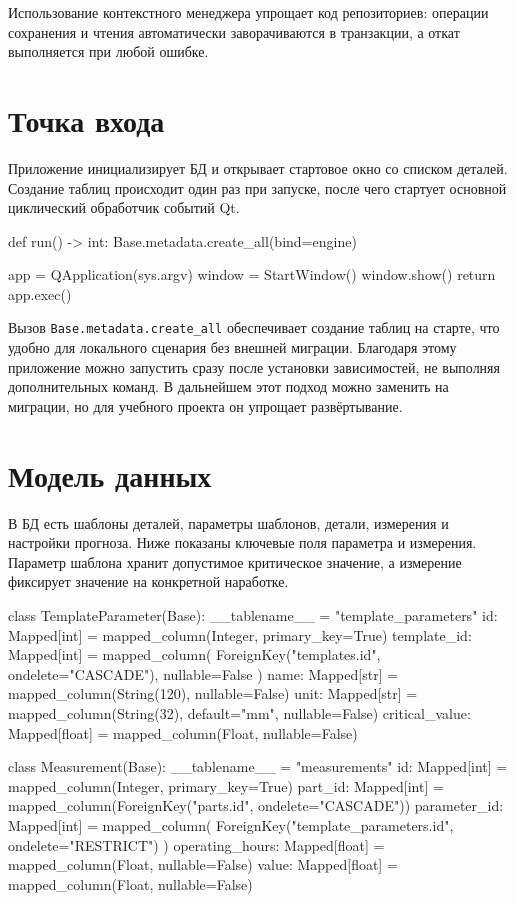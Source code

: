 \documentclass[12pt,a4paper]{article}
\begin{document}
Использование контекстного менеджера упрощает код репозиториев:
операции сохранения и чтения автоматически заворачиваются в транзакции,
а откат выполняется при любой ошибке.

\section*{Точка входа}
Приложение инициализирует БД и открывает стартовое окно со списком деталей.
Создание таблиц происходит один раз при запуске, после чего стартует основной
циклический обработчик событий Qt.
\begin{codeblock}
def run() -> int:
    Base.metadata.create_all(bind=engine)

    app = QApplication(sys.argv)
    window = StartWindow()
    window.show()
    return app.exec()
\end{codeblock}

Вызов \texttt{Base.metadata.create\_all} обеспечивает создание таблиц на старте,
что удобно для локального сценария без внешней миграции. Благодаря этому
приложение можно запустить сразу после установки зависимостей, не выполняя
дополнительных команд. В дальнейшем этот подход можно заменить на миграции,
но для учебного проекта он упрощает развёртывание.

\section*{Модель данных}
В БД есть шаблоны деталей, параметры шаблонов, детали, измерения и настройки прогноза.
Ниже показаны ключевые поля параметра и измерения.
Параметр шаблона хранит допустимое критическое значение, а измерение фиксирует
значение на конкретной наработке.
\begin{codeblock}
class TemplateParameter(Base):
    __tablename__ = "template_parameters"
    id: Mapped[int] = mapped_column(Integer, primary_key=True)
    template_id: Mapped[int] = mapped_column(
        ForeignKey("templates.id", ondelete="CASCADE"), nullable=False
    )
    name: Mapped[str] = mapped_column(String(120), nullable=False)
    unit: Mapped[str] = mapped_column(String(32), default="mm", nullable=False)
    critical_value: Mapped[float] = mapped_column(Float, nullable=False)
\end{codeblock}

\begin{codeblock}
class Measurement(Base):
    __tablename__ = "measurements"
    id: Mapped[int] = mapped_column(Integer, primary_key=True)
    part_id: Mapped[int] = mapped_column(ForeignKey("parts.id", ondelete="CASCADE"))
    parameter_id: Mapped[int] = mapped_column(
        ForeignKey("template_parameters.id", ondelete="RESTRICT")
    )
    operating_hours: Mapped[float] = mapped_column(Float, nullable=False)
    value: Mapped[float] = mapped_column(Float, nullable=False)
\end{codeblock}
\end{document}

